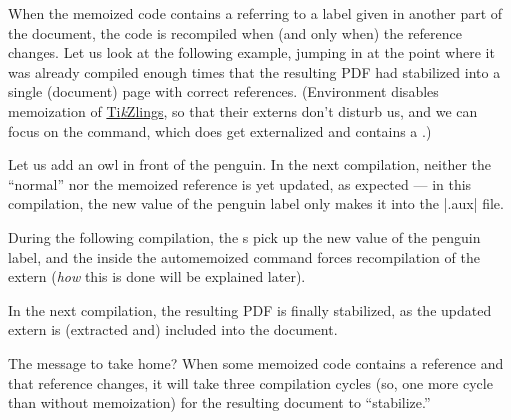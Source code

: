 \documentclass[a4paper,11pt]{article}
\begin{document}

When the memoized code contains a  referring to a label given in another
part of the document, the code is recompiled when (and only when) the reference
changes.  Let us look at the following example, jumping in at the point where
it was already compiled enough times that the resulting PDF had stabilized into
a single (document) page with correct references.  (Environment
 disables memoization
of \href{https://ctan.org/pkg/tikzlings}{Ti\emph{k}Zlings}, so that their
externs don't disturb us, and we can focus on the  command, which does
get externalized and contains a .)


Let us add an owl in front of the penguin.  In the next compilation, neither
the ``normal'' nor the memoized reference is yet updated, as expected --- in
this compilation, the new value of the penguin label only makes it into the
|.aux| file.


During the following compilation, the s pick up the new value of the
penguin label, and the  inside the automemoized  command
forces recompilation of the extern (\emph{how} this is done will be explained
later).


In the next compilation, the resulting PDF is finally stabilized, as the
updated extern is (extracted and) included into the document.  


The message to take home?  When some memoized code contains a reference and
that reference changes, it will take three compilation cycles (so, one more
cycle than without memoization) for the resulting document to ``stabilize.''
\end{document}
